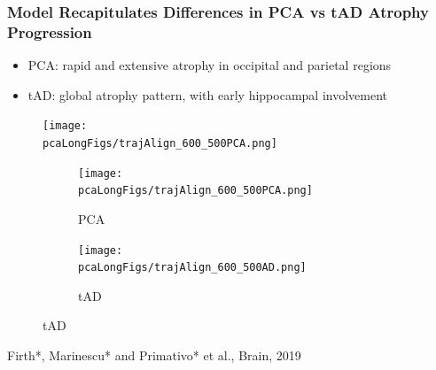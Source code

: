\documentclass[8pt,xcolor=table]{beamer}
\begin{document}
\begin{frame}
\begin{figure}[H]
\end{figure}

\end{frame}



\begin{frame}
\frametitle{Model Recapitulates Differences in PCA vs tAD Atrophy Progression}
\vspace{-2em}
\begin{itemize}
 \item PCA: rapid and extensive atrophy in occipital and parietal regions
 \item tAD: global atrophy pattern, with early hippocampal involvement
\end{itemize}

\vspace{1em}
\begin{figure}[H]
 \centering
 \texttt{[image: \\pcaLongFigs/trajAlign\_600\_500PCA.png]}
 
 \begin{subfigure}{0.49\textwidth}
\texttt{[image: \\pcaLongFigs/trajAlign\_600\_500PCA.png]}
 \label{trajDEMPCA} 
 \caption{PCA}
 \end{subfigure}
 \begin{subfigure}{0.49\textwidth}
\texttt{[image: \\pcaLongFigs/trajAlign\_600\_500AD.png]}
 \label{trajDEMAD}
 \caption{tAD}
 \end{subfigure}
\end{figure}
\begin{center}
\footnotesize{Firth*, Marinescu* and Primativo* et al., Brain, 2019} 
\end{center}



\end{frame}

\end{document}
